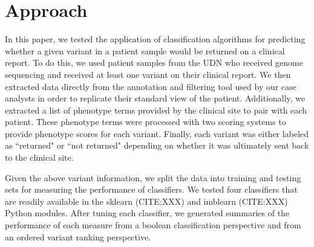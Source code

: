 \documentclass{bioinfo}
\begin{document}
\section{Approach}
In this paper, we tested the application of classification algorithms for predicting whether a given variant in a patient sample would be returned on a clinical report.  To do this, we used patient samples from the UDN \citep{ramoni2017} who received genome sequencing and received at least one variant on their clinical report.  We then extracted data directly from the annotation and filtering tool used by our case analysts in order to replicate their standard view of the patient.  Additionally, we extracted a list of phenotype terms provided by the clinical site to pair with each patient.  These phenotype terms were processed with two scoring systems to provide phenotype scores for each variant.  Finally, each variant was either labeled as ``returned" or ``not returned" depending on whether it was ultimately sent back to the clinical site.

Given the above variant information, we split the data into training and testing sets for measuring the performance of classifiers.  We tested four classifiers that are readily available in the sklearn (CITE:XXX) and imblearn (CITE:XXX) Python modules.  After tuning each classifier, we generated summaries of the performance of each measure from a boolean classification perspective and from an ordered variant ranking perspective.
\end{document}

